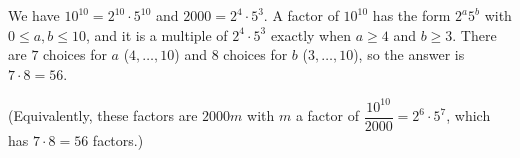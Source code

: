 We have $10^{10}=2^{10}\cdot5^{10}$ and $2000=2^4\cdot5^3$. A factor of $10^{10}$ has the form $2^a5^b$ with $0\le a,b\le10$, and it is a multiple of $2^4\cdot5^3$ exactly when $a\ge4$ and $b\ge3$. There are $7$ choices for $a$ ($4,\dots,10$) and $8$ choices for $b$ ($3,\dots,10$), so the answer is $7\cdot8=\boxed{56}$.

(Equivalently, these factors are $2000m$ with $m$ a factor of $\dfrac{10^{10}}{2000}=2^6\cdot5^7$, which has $7\cdot8=56$ factors.)
